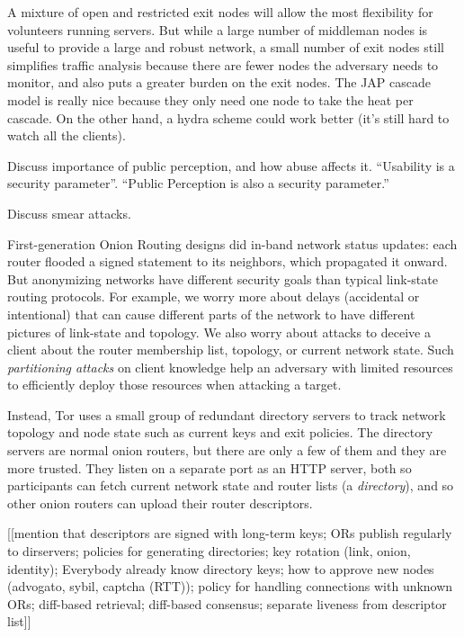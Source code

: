 \documentclass[times,10pt,twocolumn]{article}
\begin{document}
A mixture of open and restricted exit nodes will allow the most
flexibility for volunteers running servers. But while a large number
of middleman nodes is useful to provide a large and robust network,
a small number of exit nodes still simplifies traffic analysis because
there are fewer nodes the adversary needs to monitor, and also puts a
greater burden on the exit nodes.
The JAP cascade model is really nice because they only need one node to
take the heat per cascade. On the other hand, a hydra scheme could work
better (it's still hard to watch all the clients).

Discuss importance of public perception, and how abuse affects it.
``Usability is a security parameter''.  ``Public Perception is also a
security parameter.''

Discuss smear attacks.

\label{subsec:dirservers}

First-generation Onion Routing designs \cite{or-jsac98,freedom2-arch} did
in-band network status updates: each router flooded a signed statement
to its neighbors, which propagated it onward. But anonymizing networks
have different security goals than typical link-state routing protocols.
For example, we worry more about delays (accidental or intentional)
that can cause different parts of the network to have different pictures
of link-state and topology. We also worry about attacks to deceive a
client about the router membership list, topology, or current network
state. Such \emph{partitioning attacks} on client knowledge help an
adversary with limited resources to efficiently deploy those resources
when attacking a target.

Instead, Tor uses a small group of redundant directory servers to
track network topology and node state such as current keys and exit
policies. The directory servers are normal onion routers, but there are
only a few of them and they are more trusted. They listen on a separate
port as an HTTP server, both so participants can fetch current network
state and router lists (a \emph{directory}), and so other onion routers
can upload their router descriptors.

[[mention that descriptors are signed with long-term keys; ORs publish
    regularly to dirservers; policies for generating directories; key
    rotation (link, onion, identity); Everybody already know directory
    keys; how to approve new nodes (advogato, sybil, captcha (RTT));
    policy for handling connections with unknown ORs; diff-based
    retrieval; diff-based consensus; separate liveness from descriptor
    list]]
\end{document}
